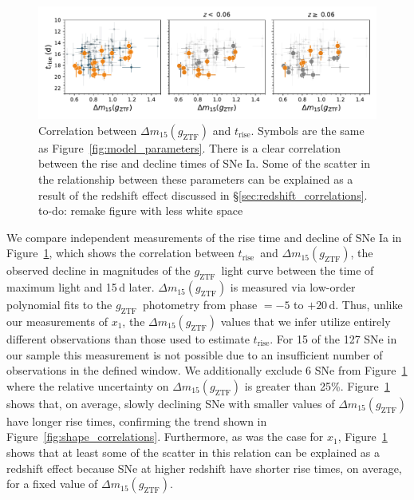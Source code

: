 \documentclass[twocolumn]{./aastex63}
\newcommand{\todo}[1]{{\color{magenta} to-do: {#1}}}
\newcommand{\gztf}{$g_\mathrm{ZTF}$}
\newcommand{\trise}{$t_\mathrm{rise}$}
\begin{document}
\begin{figure}
    \centering
    \includegraphics[width=6in]{./figures/dm15_rise.pdf}
    \caption{Correlation between $\Delta m_{15}(g_\mathrm{ZTF})$ and \trise.
    Symbols are the same as Figure~\ref{fig:model_parameters}. There is a clear
    correlation between the rise and decline times of SNe Ia. Some of the
    scatter in the relationship between these parameters can be explained as a
    result of the redshift effect discussed in
    \S\ref{sec:redshift_correlations}. \todo{remake figure with less white
    space}}
    \label{fig:dm15}
\end{figure}

We compare independent measurements of the rise time and decline of SNe Ia in
Figure~\ref{fig:dm15}, which shows the correlation between \trise\ and $\Delta
m_{15}(g_\mathrm{ZTF})$, the observed decline in magnitudes of the \gztf\
light curve between the time of maximum light and 15\,d later. $\Delta
m_{15}(g_\mathrm{ZTF})$ is measured via low-order polynomial fits to the
\gztf\ photometry from phase $= -5$ to $+20$\,d. Thus, unlike our measurements
of $x_1$, the $\Delta m_{15}(g_\mathrm{ZTF})$ values that we infer utilize
entirely different observations than those used to estimate \trise. For 15 of
the 127 SNe in our sample this measurement is not possible due to an
insufficient number of observations in the defined window. We additionally
exclude 6 SNe from Figure~\ref{fig:dm15} where the relative uncertainty on
$\Delta m_{15}(g_\mathrm{ZTF})$ is greater than 25\%. Figure~\ref{fig:dm15}
shows that, on average, slowly declining SNe with smaller values of $\Delta
m_{15}(g_\mathrm{ZTF})$ have longer rise times, confirming the trend shown in
Figure~\ref{fig:shape_correlations}. Furthermore, as was the case for $x_1$,
Figure~\ref{fig:dm15} shows that at least some of the scatter in this relation
can be explained as a redshift effect because SNe at higher redshift have
shorter rise times, on average, for a fixed value of $\Delta
m_{15}(g_\mathrm{ZTF})$.
\end{document}
